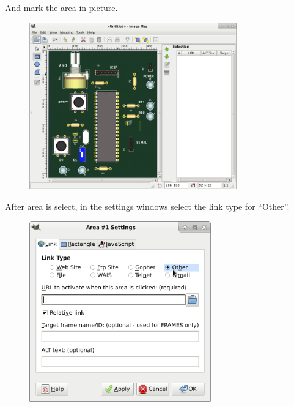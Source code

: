 And mark the area in picture.
\begin{figure}[H]
\center
\includegraphics[width=0.8\textwidth]{img/hb/gimp03.png} 
\end{figure} 

\pagebreak
After area is select, in the settings windows select the link type for ``Other''. 
\begin{figure}[H]
\center
\includegraphics[width=0.7\textwidth]{img/hb/gimp04.png} 
\end{figure} 

